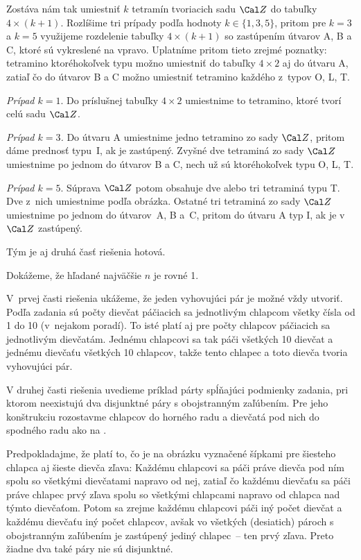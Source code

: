 {\smallskip\noindent
Zostáva nám tak umiestniť $k$ tetramín tvoriacich sadu $\Cal Z$ do tabuľky
$4\times(k+1)$. Rozlíšime tri prípady podľa hodnoty
$k\in\{1,3,5\}$, pritom pre $k=3$ a $k=5$ využijeme
rozdelenie tabuľky $4\times(k+1)$ so zastúpením útvarov A, B a
C, ktoré sú vykreslené na  vpravo. Uplatníme pritom tieto
zrejmé poznatky: tetramino ktoréhokoľvek typu možno umiestniť do
tabuľky $4\times2$ aj do útvaru A,
zatiaľ čo do útvarov B a C možno umiestniť tetramino každého
z~typov O, L, T.

{\it Prípad $k=1$}. Do príslušnej tabuľky $4\times 2$ umiestnime
to tetramino, ktoré tvorí celú sadu $\Cal Z$.

{\it Prípad $k=3$.} Do útvaru A umiestnime jedno tetramino
zo sady $\Cal Z$, pritom dáme prednosť typu~I, ak je zastúpený.
Zvyšné dve tetraminá zo sady $\Cal Z$ umiestnime
po jednom do útvarov B a C, nech už sú ktoréhokoľvek typu O, L, T.

{\it Prípad $k=5$}. Súprava $\Cal Z$ potom obsahuje dve alebo tri
tetraminá typu T. Dve z~nich umiestnime podľa obrázka. Ostatné tri
tetraminá zo sady $\Cal Z$ umiestnime po jednom do útvarov~A, B a~C,
pritom do útvaru A typ I, ak je v~$\Cal Z$ zastúpený.

Tým je aj druhá časť riešenia hotová.
}

{%
Dokážeme, že hľadané najväčšie $n$ je rovné 1.

V~prvej časti riešenia ukážeme, že jeden vyhovujúci pár je možné vždy utvoriť.
Podľa zadania sú počty dievčat páčiacich sa jednotlivým
chlapcom všetky čísla od 1 do 10 (v~nejakom poradí).
To isté platí aj pre počty chlapcov páčiacich sa jednotlivým dievčatám.
Jednému chlapcovi sa tak páči všetkých 10 dievčat a jednému dievčaťu všetkých 10 chlapcov, takže tento chlapec a toto dievča tvoria vyhovujúci pár.

V druhej časti riešenia uvedieme príklad párty
spĺňajúci podmienky zadania, pri ktorom neexistujú
dva disjunktné páry s obojstranným
zaľúbením. Pre jeho konštrukciu rozostavme chlapcov
do horného radu a dievčatá pod nich do spodného radu ako na \obr{}.
%

Predpokladajme, že platí to, čo je na obrázku vyznačené šípkami
pre šiesteho chlapca aj šieste dievča zľava:
Každému chlapcovi sa páči práve dievča pod ním
spolu so všetkými dievčatami napravo od nej, zatiaľ čo každému dievčaťu sa páči
práve chlapec prvý zľava spolu so všetkými chlapcami
napravo od chlapca nad týmto dievčaťom.
Potom sa zrejme každému chlapcovi páči iný počet dievčat a každému dievčaťu iný počet
chlapcov, avšak vo všetkých (desiatich) pároch s obojstranným zaľúbením
je zastúpený jediný chlapec~-- ten prvý zľava. Preto žiadne dva
také páry nie sú disjunktné.
}

